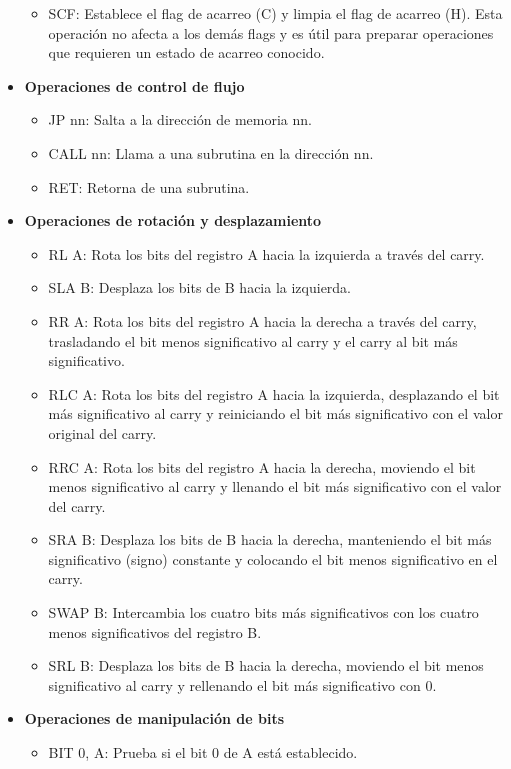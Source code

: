 \begin{itemize}
\begin{itemize}
  \item SCF: Establece el flag de acarreo (C) y limpia el flag de acarreo (H). Esta operación no afecta a los demás flags y es útil para preparar operaciones que requieren un estado de acarreo conocido.
  \end{itemize}
  \item \textbf{Operaciones de control de flujo}
  \begin{itemize}
  \item JP nn: Salta a la dirección de memoria nn.
  \item CALL nn: Llama a una subrutina en la dirección nn.
  \item RET: Retorna de una subrutina.
  \end{itemize}
  \item \textbf{Operaciones de rotación y desplazamiento}
  \begin{itemize}
  \item RL A: Rota los bits del registro A hacia la izquierda a través del carry.
  \item SLA B: Desplaza los bits de B hacia la izquierda.
  \item RR A: Rota los bits del registro A hacia la derecha a través del carry, trasladando el bit menos significativo al carry y el carry al bit más significativo.
  \item RLC A: Rota los bits del registro A hacia la izquierda, desplazando el bit más significativo al carry y reiniciando el bit más significativo con el valor original del carry.
  \item RRC A: Rota los bits del registro A hacia la derecha, moviendo el bit menos significativo al carry y llenando el bit más significativo con el valor del carry.
  \item SRA B: Desplaza los bits de B hacia la derecha, manteniendo el bit más significativo (signo) constante y colocando el bit menos significativo en el carry.
  \item SWAP B: Intercambia los cuatro bits más significativos con los cuatro menos significativos del registro B.
  \item SRL B: Desplaza los bits de B hacia la derecha, moviendo el bit menos significativo al carry y rellenando el bit más significativo con 0.
  \end{itemize}
  \item \textbf{Operaciones de manipulación de bits}
  \begin{itemize}
  \item BIT 0, A: Prueba si el bit 0 de A está establecido.

\end{itemize}
\end{itemize}
